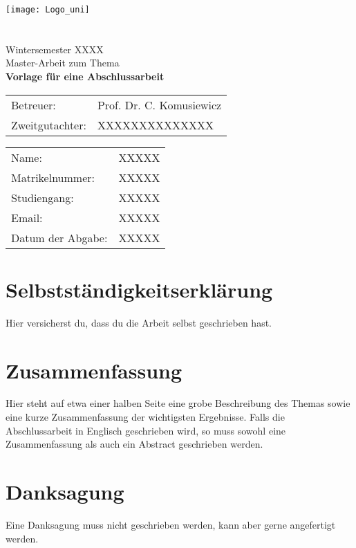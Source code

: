 \documentclass[12pt,a4paper]{article}
\begin{document}
\begin{titlepage}
\begin{center}
\texttt{[image: Logo\_uni]} \\[5pt]
{\large{}}  \\[5pt]
{\large{}}   \\[10pt]
{\large Wintersemester XXXX} \\[1cm]
{\large{Master-Arbeit zum Thema}} \\[10pt]
	{\Large\textbf{Vorlage für eine Abschlussarbeit}}\\[1cm]
\begin{tabular}[l]{ll}
{\large Betreuer:} & {\large Prof. Dr. C. Komusiewicz}\\
{\large Zweitgutachter:} & {\large XXXXXXXXXXXXXX}
\end{tabular}
\end{center}

	
\vfill
\begin{tabular}[l]{ll}
Name:           & XXXXX\\
Matrikelnummer: & XXXXX\\
Studiengang:    & XXXXX\\
Email: & XXXXX\\
Datum der Abgabe: & XXXXX \\
\end{tabular}
\end{titlepage}

\section*{Selbstständigkeitserklärung}
Hier versicherst du, dass du die Arbeit selbst geschrieben hast.

\section*{Zusammenfassung}
Hier steht auf etwa einer halben Seite eine grobe Beschreibung des Themas sowie eine kurze Zusammenfassung der wichtigsten Ergebnisse. 
Falls die Abschlussarbeit in Englisch geschrieben wird, so muss sowohl eine Zusammenfassung als auch ein Abstract geschrieben werden.

\section*{Danksagung}
Eine Danksagung muss nicht geschrieben werden, kann aber gerne angefertigt werden.
\end{document}
